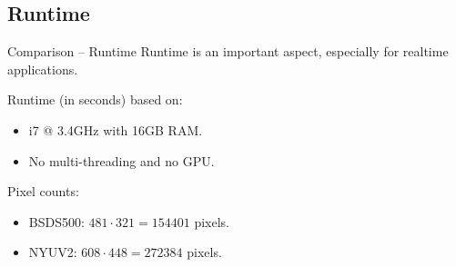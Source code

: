 \documentclass[handout]{beamer}
\begin{document}
%		
%		
	
	\subsection{Runtime}
	\begin{frame}{Comparison -- Runtime}
		Runtime is an important aspect, especially for realtime applications.
		\vskip 0.5cm
		
		Runtime (in seconds) based on:
		\vskip 0.25cm
		\begin{itemize}[label=--]
			\item i7 @ 3.4GHz with 16GB RAM.
			\item No multi-threading and no GPU.
		\end{itemize}
		\vskip 0.5cm
		
		Pixel counts:
		\vskip 0.25cm
		\begin{itemize}[label=--]
			\item BSDS500: $481 \cdot 321 = 154401$ pixels.
			\item NYUV2: $608 \cdot 448 = 272384$ pixels.
		\end{itemize}
		\vskip 0.5cm
	\end{frame}
	
\end{document}
